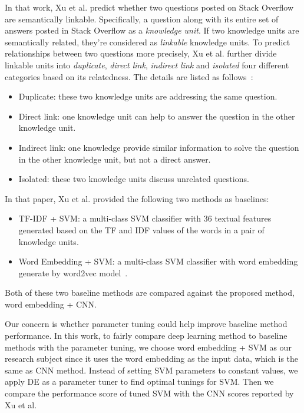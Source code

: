 \documentclass[sigconf,review, anonymous]{acmart}
\theoremstyle{break}
\begin{document}
In that work, Xu et al. predict whether two questions posted on Stack Overflow are semantically linkable. 
Specifically,  a question along with its entire set of answers posted in Stack Overflow
as a {\it knowledge unit}. If two knowledge units are semantically related, they're considered
as {\it linkable} knowledge units. To predict relationships between two questions more precisely, 
Xu et al. further divide linkable  units 
into {\it duplicate}, {\it direct link}, {\it indirect link} and {\it isolated}  four different categories 
based on its relatedness. The details are listed as follows~\cite{xu2016predicting}:

\begin{itemize}
\item Duplicate:  these two knowledge units are addressing the same question.
\item Direct link: one knowledge unit can help to answer the question in the other knowledge unit.
\item Indirect link: one knowledge provide similar information to solve the question in the other knowledge unit, but not a direct answer.
\item Isolated: these two knowledge units discuss unrelated questions.
\end{itemize}

In that paper, Xu et al. provided the following two methods as baselines:

\begin{itemize}
\item TF-IDF + SVM: a multi-class SVM classifier with  36 textual features generated  based on the 
TF and IDF values of the words in a pair of knowledge units. 
\item Word Embedding + SVM:  a multi-class SVM classifier with word embedding generate by word2vec model~\cite{mikolov2013distributed}.
\end{itemize}
Both of these two baseline methods are compared against the proposed method, word embedding + CNN. 

Our concern is whether parameter tuning could help improve baseline method performance.
In this work, to fairly compare deep learning method to baseline methods with the parameter tuning,
we choose word embedding + SVM as our research subject since it uses the word embedding as the
input data, which is the same as CNN method. 
Instead of setting SVM parameters to constant values, we apply DE as a parameter tuner to find optimal tunings
for SVM. Then we compare the performance score of tuned SVM  with the CNN scores reported by Xu et al. 
\end{document}
